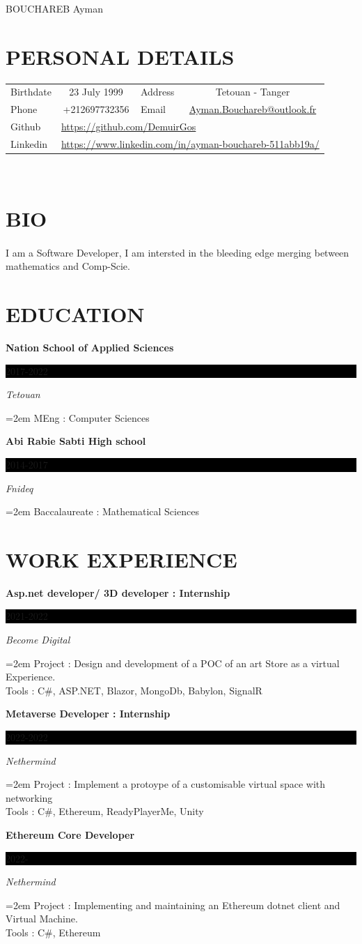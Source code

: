 \documentclass[paper=a4,fontsize=11pt]{scrartcl} %
\newcommand{\sepspace}{\vspace*{1em}}		%
\newcommand{\MyName}[1]{ %
		\Huge \usefont{OT1}{phv}{b}{n} \hfill #1
		\par \normalsize \normalfont}
\newcommand{\NewPart}[1]{\section*{\uppercase{#1}}}
\newcommand{\EducationEntry}[4]{
		\noindent \textbf{#1} \hfill      %
		\colorbox{Black}{%
			\parbox{6em}{%
			\hfill\color{White}#2}} \par  %
		\noindent \textit{#3} \par        %
		\noindent\hangindent=2em\hangafter=0 \small #4 %
		\normalsize \par}
\begin{document}
\MyName{BOUCHAREB Ayman }
\sepspace
\NewPart{Personal Details}{}
\begin{tabular}{ c c c c }
 \multicolumn{1}{l}{Birthdate} & 23 July 1999} &  \multicolumn{1}{l}{Address} & Tetouan - Tanger \\  
 \multicolumn{1}{l}{Phone} & +212697732356 & 
 \multicolumn{1}{l}{Email} & \url{Ayman.Bouchareb@outlook.fr} \\
 \multicolumn{1}{l}{Github} & \multicolumn{3}{l}{\url{https://github.com/DemuirGos}} \\
 \multicolumn{1}{l}{Linkedin} & \multicolumn{3}{l}{\url{https://www.linkedin.com/in/ayman-bouchareb-511abb19a/}}
\end{tabular}\\

\NewPart{Bio}{}

\paragraph{}{I am a Software Developer, I am intersted in the bleeding edge merging between mathematics and Comp-Scie.}

\NewPart{Education}{}

\EducationEntry{Nation School of Applied Sciences }{2017-2022}{Tetouan}{MEng : Computer Sciences}

\EducationEntry{Abi Rabie Sabti High school}{2014-2017}{Fnideq}{Baccalaureate : Mathematical Sciences}

\NewPart{Work Experience}{}

\EducationEntry{Asp.net developer/ 3D developer : Internship}{2021-2022}{Become Digital}{Project : Design and development of a POC of an art Store as a virtual Experience.\\
Tools : C\#, ASP.NET, Blazor, MongoDb, Babylon, SignalR}

\EducationEntry{Metaverse Developer : Internship}{2022-2022}{Nethermind}{Project : Implement a protoype of a customisable virtual space with networking\\
Tools : C\#, Ethereum, ReadyPlayerMe, Unity}

\EducationEntry{Ethereum Core Developer}{2022-}{Nethermind}{Project : Implementing and maintaining an Ethereum dotnet client and Virtual Machine.\\
Tools : C\#, Ethereum}
\end{document}
